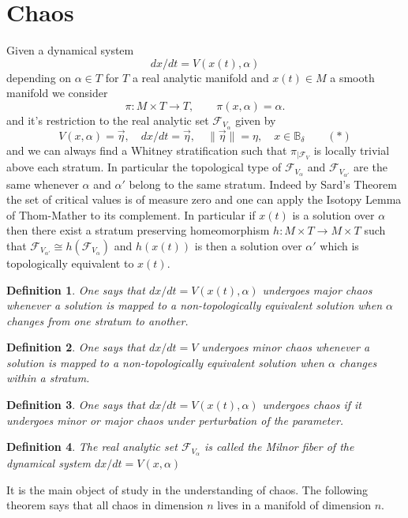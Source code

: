 \documentclass[10pt,a4paper]{amsart}
\newtheorem{definition}{Definition}
\begin{document}
\section{Chaos}

Given a dynamical system
$$dx/dt=V(x(t), \alpha)$$
depending on $\alpha\in T$ for $T$ a real analytic manifold and $x(t)\in M$ a smooth manifold we consider 
$$\pi: M\times T\to T,\qquad \pi(x,\alpha)=\alpha.$$
and it's restriction to the real analytic set $\mathcal{F}_{V_{\alpha}}$ given by
$$V(x, \alpha)=\vec{\eta},\quad dx/dt=\vec{\eta},\quad \lVert\vec{\eta}\rVert=\eta,\quad x\in \mathbb{B}_{\delta}\qquad(\ast)$$
and we can always find a Whitney stratification such that $\pi_{|\mathcal{F}_V}$ is locally trivial above each stratum. In particular the topological type of $\mathcal{F}_{V_{\alpha}}$ and $\mathcal{F}_{V_{\alpha'}}$ are the same whenever $\alpha$ and  $\alpha'$ belong to the same stratum. Indeed by Sard's Theorem \cite{Kosinski} the set of critical values is of measure zero and one can apply the Isotopy Lemma of Thom-Mather \cite{Kosinski} to its complement. In particular if $x(t)$ is a solution over $\alpha$ then there exist a stratum preserving homeomorphism $h: M\times T\to M\times T$ such that $\mathcal{F}_{V_{\alpha'}}\cong h(\mathcal{F}_{V_{\alpha}})$ and $h(x(t))$ is then a solution over $\alpha'$ which is topologically equivalent to $x(t)$.

\begin{definition} One says that
$dx/dt=V(x(t), \alpha)$ undergoes major chaos whenever a solution is mapped to a non-topologically equivalent solution when $\alpha$ changes from one stratum to another.
\end{definition}
\begin{definition} One says that $dx/dt=V$ undergoes minor chaos whenever a solution is mapped to a non-topologically equivalent solution when $\alpha$ changes within a stratum. 
\end{definition}
\begin{definition}
One says that $dx/dt=V(x(t), \alpha)$ undergoes chaos if it undergoes minor or major chaos under perturbation of the parameter.
\end{definition}

\begin{definition}
    The real analytic set $\mathcal{F}_{V_\alpha}$ is called the Milnor fiber of the dynamical system $dx/dt=V(x, \alpha)$
\end{definition}

It is the main object of study in the understanding of chaos. The following theorem says that all chaos in dimension $n$ lives in a manifold of dimension $n$.
\end{document}

